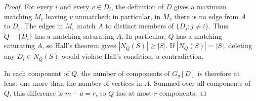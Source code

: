 \documentclass[10pt,a4paper]{amsart}
\begin{document}
\begin{proof}
For every $i$ and every $v\in D_i$, the definition of $D$ gives a maximum matching $M_v$ leaving $v$ unmatched; in particular, in $M_v$ there is no edge from $A$ to $D_i$. 
The edges in $M_v$ match $A$ to distinct members of $\{D_j:j\ne i\}$.
Thus $Q-\{D_i\}$ has a matching saturating $A$.
In particular, $Q$ has a matching saturating $A$, so Hall's theorem gives $|N_Q(S)|\ge|S|$.
If $|N_Q(S)|=|S|$, deleting any $D_i\in N_Q(S)$ would violate Hall's condition, a contradiction.

In each component of $Q$, the number of components of $G_p[D]$ is therefore at least one more than the number of vertices in $A$.
Summed over all components of $Q$, this difference is $m-a=r$, so $Q$ has at most $r$ components.
\end{proof}



\end{document}
